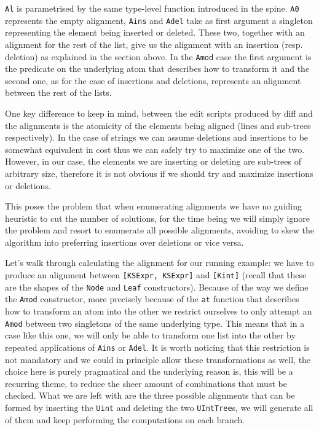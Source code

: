 \documentclass[11pt, titlepage]{article}
\begin{document}
\texttt{Al} is parametrised by the same type-level function introduced in the spine. 
\texttt{A0} represents the empty alignment, \texttt{Ains} and \texttt{Adel} take as first argument
a singleton representing the element being inserted or deleted. These two, together
with an alignment for the rest of the list, give us the alignment with
an insertion (resp. deletion) as explained in the section above. In the
\texttt{Amod} case the first argument is the predicate on the underlying atom that describes how to transform 
it and the second one, as for the case of insertions and deletions, represents an  
alignment between the rest of the lists. 

One key difference to keep in mind, between the edit scripts produced by diff and the alignments is the atomicity 
of the elements being aligned (lines and sub-trees respectively). In the
case of strings we can assume deletions and insertions to be somewhat
equivalent in cost thus we can safely try to maximize one of the two.
However, in our case, the elements we are inserting or deleting are
sub-trees of arbitrary size, therefore it is not obvious if we should try and maximize
insertions or deletions.

This poses the problem that when enumerating alignments we have no guiding heuristic to cut the number
of solutions, for the time being we will simply ignore the problem and resort to enumerate
all possible alignments, avoiding to skew the algorithm into preferring
insertions over deletions or vice versa.

Let's walk through calculating the alignment for our running example: we have to 
produce an alignment between \texttt{[KSExpr, KSExpr]} and \texttt{[Kint]} (recall that these are the shapes of the 
\texttt{Node} and \texttt{Leaf} constructors). Because of the way we 
define the \texttt{Amod} constructor, more precisely because of the \texttt{at} 
function that describes how to transform an atom into the other we restrict 
ourselves to only attempt an \texttt{Amod} between two singletons of the same underlying 
type. This means that in a case like this one, we will only be able to transform 
one list into the other by repeated applications of \texttt{Ains} or 
\texttt{Adel}. It is worth noticing that this restriction is not mandatory and 
we could in principle allow these transformations as well, the choice here is purely pragmatical and the underlying reason is,
this will be a recurring theme, to reduce the sheer amount of combinations that must be checked.
What we are left with are the three possible alignments that can be formed by inserting the \texttt{Uint}
and deleting the two \texttt{UIntTree}s, we will generate all of them and keep performing 
the computations on each branch. 
\end{document}
